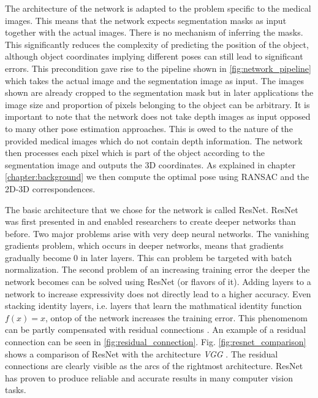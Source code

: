 The architecture of the network is adapted to the problem specific to the medical images. This means that the network expects segmentation masks as input together with the actual images. There is no mechanism of inferring the masks. This significantly reduces the complexity of predicting the position of the object, although object coordinates implying different poses can still lead to significant errors. This precondition gave rise to the pipeline shown in \fig \ref{fig:network_pipeline} which takes the actual image and the segmentation image as input. The images shown are already cropped to the segmentation mask but in later applications the image size and proportion of pixels belonging to the object can be arbitrary. It is important to note that the network does not take depth images as input opposed to many other pose estimation approaches. This is owed to the nature of the provided medical images which do not contain depth information. The network then processes each pixel which is part of the object according to the segmentation image and outputs the 3D coordinates. As explained in chapter \ref{chapter:background} we then compute the optimal pose using RANSAC and the 2D-3D correspondences.

The basic architecture that we chose for the network is called ResNet. ResNet was first presented in \cite{resnet} and enabled researchers to create deeper networks than before. Two major problems arise with very deep neural networks. The vanishing gradients problem, which occurs in deeper networks, means that gradients gradually become 0 in later layers. This can problem be targeted with batch normalization. The second problem of an increasing training error the deeper the network becomes can be solved using ResNet (or flavors of it). Adding layers to a network to increase expressivity does not directly lead to a higher accuracy. Even stacking identity layers, i.e. layers that learn the mathmatical identity function $f(x) = x$, ontop of the network increases the training error. This phenomenom can be partly compensated with residual connections \cite{resnet}. An example of a residual connection can be seen in \fig \ref{fig:residual_connection}. Fig. \ref{fig:resnet_comparison} shows a comparison of ResNet with the architecture \textit{VGG} \cite{vgg}. The residual connections are clearly visible as the arcs of the rightmost architecture. ResNet has proven to produce reliable and accurate results in many computer vision tasks.


